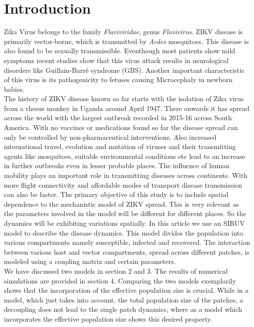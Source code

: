 \documentclass{article}
\begin{document}
\section{Introduction}
Zika Virus belongs to the family \textit{Flaviviridae}, genus \textit{Flavivirus}. ZIKV disease is primarily vector-borne, which is transmitted by \textit{Aedes} mosquitoes\cite{Aedes_ZIKV}. This disease is also found to be sexually transmissible\cite{Sexually_transmitted}. 
Eventhough most patients show mild symptoms recent studies show that this virus attack results in neurological disorders like Guillain-Barré syndrome (GBS)\cite{Guillian_Barre}. Another important characteristic of this virus is its pathogenicity to fetuses causing  Microcephaly in newborn babies\cite{Microcephaly}.\\
The history of ZIKV disease known so far starts with the isolation of Zika virus from a rhesus monkey in Uganda around April 1947. There onwards it has spread across the world with the largest outbreak recorded in 2015-16 across South America\cite{ZIKV_SA,Aedes_ZIKV}. With no vaccines or medications found so far the disease spread can only be controlled by non-pharmaceutical interventions. Also increased international travel, evolution and mutation of viruses and their transmitting agents like mosquitoes, suitable environmental conditions etc lead to an increase in further outbreaks even in lesser probable places. The influence of human mobility plays an important role in transmitting diseases across continents. With more flight connectivity and affordable modes of transport disease transmission can also be faster. The primary objective of this study is to include spatial dependence to the mechanistic model of ZIKV spread. This is very relevant as the parameters involved in the model will be different for different places. So the dynamics will be exhibiting variations spatially. In this article we use an SIRUV model to describe the disease dynamics. This model divides the population into various compartments namely susceptible, infected and recovered. The interaction between various host and vector compartments, spread across different patches, is modeled using a coupling matrix and certain parameters.\\   
 We have discussed two models in section 2 and 3. The results of numerical simulations are provided in section 4. Comparing the two models exemplarily shows that the incorporation of the effective population size is crucial. While in a model, which just takes into account, the total population size of the patches, a decoupling does not lead to  the single patch dynamics, where as a model which incorporates the effective population size shows this desired property. 
\end{document}
